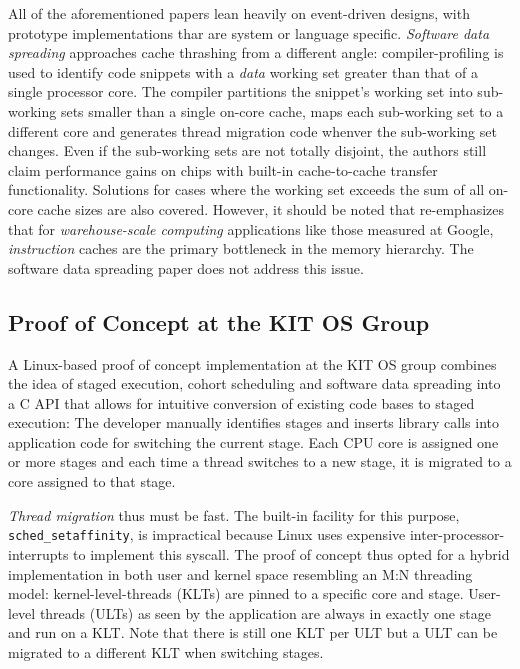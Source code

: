 \documentclass{article}
\begin{document}
All of the aforementioned papers lean heavily on event-driven designs, with prototype implementations thar are
system or language specific.
\emph{Software data spreading} \cite{sodaspr} approaches cache thrashing from a different angle: compiler-profiling is used
to identify code snippets with a \emph{data} working set greater than that of a single processor core.
The compiler partitions the snippet's working set into sub-working sets smaller than a single on-core cache, maps each
sub-working set to a different core and generates thread migration code whenver the sub-working set changes.
Even if the sub-working sets are not totally disjoint, the authors still claim performance gains
on chips with built-in cache-to-cache transfer functionality.
Solutions for cases where the working set exceeds the sum of all on-core cache sizes are also covered.
However, it should be noted that \cite{kanev2015profiling} re-emphasizes that for \textit{warehouse-scale computing} applications
like those measured at Google, \emph{instruction} caches are the primary bottleneck in the memory hierarchy.
The software data spreading paper does not address this issue.

\subsection{Proof of Concept at the KIT OS Group}\label{proofofconcept}

A Linux-based proof of concept implementation at the KIT OS group combines the idea of staged execution, cohort
scheduling and software data spreading into a C API that allows for intuitive conversion of existing code bases to
staged execution:
The developer manually identifies stages and inserts library calls into application code for switching the current stage.
Each CPU core is assigned one or more stages and each time a thread switches to a new stage, it is migrated to a core
assigned to that stage.

\emph{Thread migration} thus must be fast.
The built-in facility for this purpose, \texttt{sched\_setaffinity}, is impractical because Linux uses
expensive inter-processor-interrupts to implement this syscall.
The proof of concept thus opted for a hybrid implementation in both user and kernel space resembling an M:N threading model:
kernel-level-threads (KLTs) are pinned to a specific core and stage.
User-level threads (ULTs) as seen by the application are always in exactly one stage and run on a KLT.
Note that there is still one KLT per ULT but a ULT can be migrated to a different KLT when switching stages.
\end{document}
